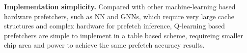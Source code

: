 \textbf{Implementation simplicity.} Compared with other machine-learning based hardware 
prefetchers, such as NN and GNNs, which require very large cache structures and complex 
hardware for prefetch inference, Q-learning based prefetchers are simple to implement in a 
table based scheme, requireing smaller chip area and power to achieve the same prefetch 
accuracy results.
